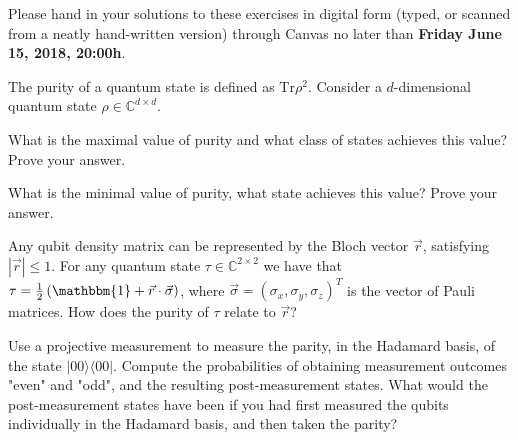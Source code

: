 \documentclass[a4paper,10pt,landscape,twocolumn]{scrartcl}
\newcommand{\proj}[1]{| #1 \rangle \langle #1 |}
\newcommand{\Tr}{\text{Tr}}
\newcommand\deadline{Friday June 15, 2018, 20:00h}
\begin{document}
\homeworkproblems

{\sffamily\noindent
Please hand in your solutions to these exercises in digital form (typed, or scanned from a neatly hand-written version) through Canvas no later than \textbf{\deadline}.  %
}


\begin{exercise}[Purity]
The purity of a quantum state is defined as $\Tr\rho^2$. Consider a $d$-dimensional quantum state $\rho\in \mathbb{C}^{d\times d}$.
\begin{subex}
What is the maximal value of purity and what class of states achieves this value? Prove your answer.
\end{subex}
\begin{subex}
What is the minimal value of purity, what state achieves this value? Prove your answer.
\end{subex}

\begin{subex}
Any qubit density matrix can be represented by the Bloch vector $\vec{r}$, satisfying $|\vec{r}|\leq 1$. For any quantum state $\tau\in \mathbb{C}^{2\times 2}$ we have that $\tau= \frac{1}{2}\left( \mathbbm{1} + \vec{r}\cdot \vec{\sigma} \right)$, where $\vec{\sigma}=(\sigma_x,\sigma_y,\sigma_z)^T$ is the vector of Pauli matrices. How does the purity of $\tau$ relate to $\vec{r}$?
\end{subex}

\end{exercise}



\begin{exercise}
Use a projective measurement to measure the parity, in the Hadamard basis, of
the state $\proj{00}$. Compute the probabilities of obtaining measurement outcomes "even" and
"odd", and the resulting post-measurement states. What would the post-measurement states have
been if you had first measured the qubits individually in the Hadamard basis, and then taken the
parity?
\end{exercise}
\end{document}
